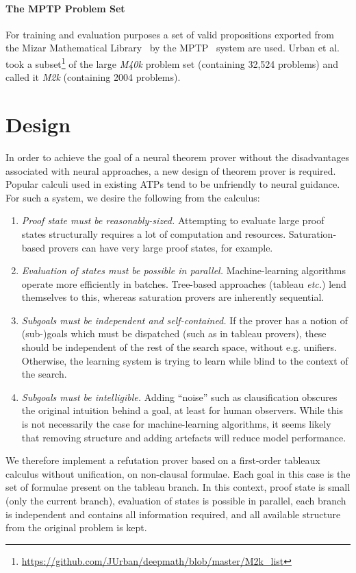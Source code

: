 \documentclass{llncs}
\newcommand{\mizarlarge}{\textit{M40k}}
\newcommand{\mizarsmall}{\textit{M2k}}
\begin{document}
\paragraph{The MPTP Problem Set}
For training and evaluation purposes a set of valid propositions exported from the Mizar Mathematical Library~\cite{mizar} by the MPTP~\cite{MPTP} system are used.
Urban et al.~\cite{rlCoP} took a subset\footnote{\url{https://github.com/JUrban/deepmath/blob/master/M2k_list}} of the large \mizarlarge{} problem set (containing 32,524 problems) and called it \mizarsmall{} (containing 2004 problems).

\section{Design}
\label{section:Design}
In order to achieve the goal of a neural theorem prover without the disadvantages associated with neural approaches, a new design of theorem prover is required.
Popular calculi used in existing ATPs tend to be unfriendly to neural guidance.
For such a system, we desire the following from the calculus:
\begin{enumerate}
        \item \emph{Proof state must be reasonably-sized.} Attempting to evaluate large proof states structurally requires a lot of computation and resources. Saturation-based provers can have very large proof states, for example.
        \item \emph{Evaluation of states must be possible in parallel.} Machine-learning algorithms operate more efficiently in batches. Tree-based approaches (tableau \emph{etc.}) lend themselves to this, whereas saturation provers are inherently sequential.
        \item \emph{Subgoals must be independent and self-contained.} If the prover has a notion of (sub-)goals which must be dispatched (such as in tableau provers), these should be independent of the rest of the search space, without e.g. unifiers. 
        Otherwise, the learning system is trying to learn while blind to the context of the search.
	\item \emph{Subgoals must be intelligible.} Adding ``noise'' such as clausification obscures the original intuition behind a goal, at least for human observers. While this is not necessarily the case for machine-learning algorithms, it seems likely that removing structure and adding artefacts will reduce model performance.
\end{enumerate}
We therefore implement a refutation prover based on a first-order tableaux calculus without unification, on non-clausal formulae.
Each goal in this case is the set of formulae present on the tableau branch.
In this context, proof state is small (only the current branch), evaluation of states is possible in parallel, each branch is independent and contains all information required, and all available structure from the original problem is kept.
\end{document}
